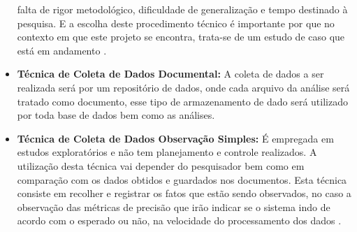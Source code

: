 \begin{itemize}
                                                                                                    falta de rigor metodológico, dificuldade de generalização e tempo
                                                                                                    destinado à pesquisa. E a escolha deste procedimento técnico é
                                                                                                    importante por que no contexto em que este projeto se encontra,
                                                                                                    trata-se de um estudo de caso que está em andamento \cite{prodanov2013}.
            \item \textbf{Técnica de Coleta de Dados Documental:} A coleta de dados a ser realizada será por um repositório de dados,
                                                                                                        onde cada arquivo da análise será tratado como documento, esse
                                                                                                        tipo de armazenamento de dado será utilizado por toda base de
                                                                                                        dados bem como as análises.
            \item \textbf{Técnica de Coleta de Dados Observação Simples:} É empregada em estudos exploratórios e não tem
                                                                                                                      planejamento e controle realizados. A utilização desta
                                                                                                                      técnica vai depender do pesquisador bem como em
                                                                                                                      comparação com os dados obtidos e guardados nos
                                                                                                                      documentos. Esta técnica consiste em recolher e registrar
                                                                                                                      os fatos que estão sendo observados, no caso a
                                                                                                                      observação das métricas de precisão que irão indicar
                                                                                                                      se o sistema indo de acordo com o esperado ou não,
                                                                                                                      na velocidade do processamento dos dados \cite{prodanov2013}.
        \end{itemize}

